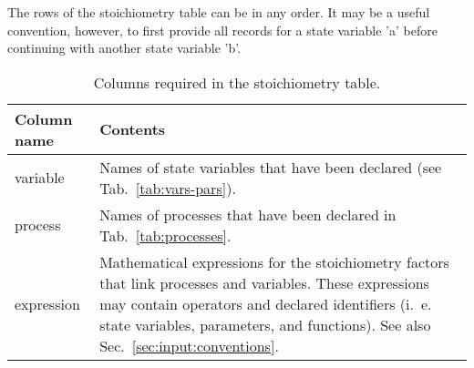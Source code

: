 \documentclass[a4paper]{article}
\begin{document}
The rows of the stoichiometry table can be in any order. It may be a useful convention, however, to first provide all records for a state variable 'a' before continuing with another state variable 'b'.

\begin{table}[!h]
  \caption{Columns required in the stoichiometry table. \label{tab:stoichiometry}}
  \begin{tabular}{lp{}} \hline\hline
    \textbf{Column name} & \textbf{Contents} \\ \hline
    variable & Names of state variables that have been declared (see Tab.~\ref{tab:vars-pars}). \\
    process & Names of processes that have been declared in Tab.~\ref{tab:processes}. \\
    expression & Mathematical expressions for the stoichiometry factors that link processes and variables. These expressions may contain operators and declared identifiers (i.~e. state variables, parameters, and functions). See also Sec.~\ref{sec:input:conventions}. \\
    \hline
  \end{tabular}
\end{table}
\end{document}
